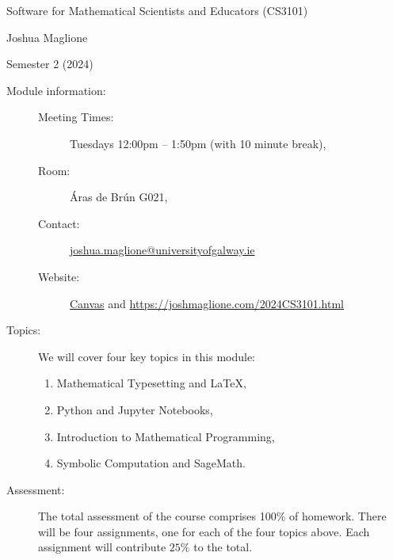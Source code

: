 \documentclass[a4paper, 12pt]{article}
\begin{document}
\pagestyle{empty}

\begin{center}
{\Large Software for Mathematical Scientists and Educators (CS3101)} 

\vspace{0.25cm}

{\large Joshua Maglione}

\vspace{0.25cm}

Semester 2 (2024)
\end{center}

\vspace{0.5cm}

\begin{description}
    \item[Module information:] \hfill
    \begin{description}
      \item[Meeting Times:] Tuesdays 12:00pm -- 1:50pm (with 10 minute break),
      \item[Room:] \'Aras de Br\'un G021,
      \item[Contact:] \url{joshua.maglione@universityofgalway.ie} 
      \item[Website:] \href{https://universityofgalway.instructure.com/}{\textsf{Canvas}} and \url{https://joshmaglione.com/2024CS3101.html} 
    \end{description} 
    \vspace{1cm}
    \item[Topics:] We will cover four key topics in this module:
    \begin{enumerate} 
      \item Mathematical Typesetting and \LaTeX,
      \item Python and Jupyter Notebooks,
      \item Introduction to Mathematical Programming,
      \item Symbolic Computation and SageMath.
    \end{enumerate}
    
    \vspace{1cm}
    \item[Assessment:] The total assessment of the course comprises 100\% of
    homework. There will be four assignments, one for each of the four topics
    above. Each assignment will contribute $25\%$ to the total. 
\end{description}
\end{document}
